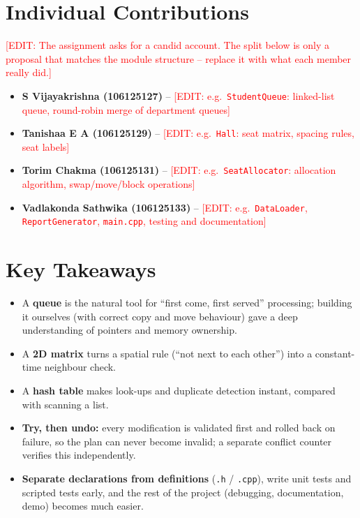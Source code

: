 \documentclass[12pt,a4paper]{report}
\newcommand{\todo}[1]{\textcolor{red}{[EDIT: #1]}}
\begin{document}
\section{Individual Contributions}
\todo{The assignment asks for a candid account. The split below is only a proposal that matches the module structure -- replace it with what each member really did.}

\begin{itemize}
  \item \textbf{S Vijayakrishna (106125127)} -- \todo{e.g.\ \texttt{StudentQueue}: linked-list queue, round-robin merge of department queues}
  \item \textbf{Tanishaa E A (106125129)} -- \todo{e.g.\ \texttt{Hall}: seat matrix, spacing rules, seat labels}
  \item \textbf{Torim Chakma (106125131)} -- \todo{e.g.\ \texttt{SeatAllocator}: allocation algorithm, swap/move/block operations}
  \item \textbf{Vadlakonda Sathwika (106125133)} -- \todo{e.g.\ \texttt{DataLoader}, \texttt{ReportGenerator}, \texttt{main.cpp}, testing and documentation}
\end{itemize}

\section{Key Takeaways}
\begin{itemize}
  \item A \textbf{queue} is the natural tool for ``first come, first served'' processing; building it ourselves (with correct copy and move behaviour) gave a deep understanding of pointers and memory ownership.
  \item A \textbf{2D matrix} turns a spatial rule (``not next to each other'') into a constant-time neighbour check.
  \item A \textbf{hash table} makes look-ups and duplicate detection instant, compared with scanning a list.
  \item \textbf{Try, then undo:} every modification is validated first and rolled back on failure, so the plan can never become invalid; a separate conflict counter verifies this independently.
  \item \textbf{Separate declarations from definitions} (\texttt{.h} / \texttt{.cpp}), write unit tests and scripted tests early, and the rest of the project (debugging, documentation, demo) becomes much easier.
\end{itemize}
\end{document}
